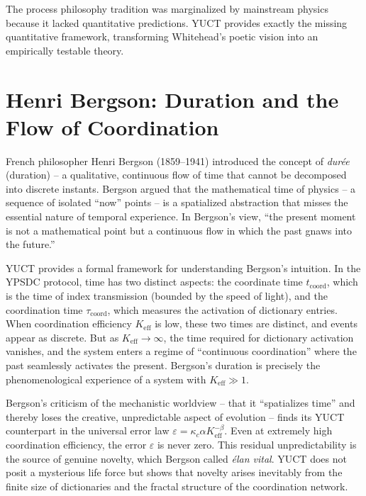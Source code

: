 \documentclass[12pt,a4paper]{article}
\begin{document}
	The process philosophy tradition was marginalized by mainstream physics because it lacked quantitative predictions. YUCT provides exactly the missing quantitative framework, transforming Whitehead's poetic vision into an empirically testable theory.
	
	\section{Henri Bergson: Duration and the Flow of Coordination}
	
	French philosopher Henri Bergson (1859–1941) introduced the concept of \emph{durée} (duration) -- a qualitative, continuous flow of time that cannot be decomposed into discrete instants. Bergson argued that the mathematical time of physics -- a sequence of isolated ``now'' points -- is a spatialized abstraction that misses the essential nature of temporal experience. In Bergson's view, ``the present moment is not a mathematical point but a continuous flow in which the past gnaws into the future.''
	
	YUCT provides a formal framework for understanding Bergson's intuition. In the YPSDC protocol, time has two distinct aspects: the coordinate time \(t_{\text{coord}}\), which is the time of index transmission (bounded by the speed of light), and the coordination time \(\tau_{\text{coord}}\), which measures the activation of dictionary entries. When coordination efficiency \(K_{\mathrm{eff}}\) is low, these two times are distinct, and events appear as discrete. But as \(K_{\mathrm{eff}} \to \infty\), the time required for dictionary activation vanishes, and the system enters a regime of ``continuous coordination'' where the past seamlessly activates the present. Bergson's duration is precisely the phenomenological experience of a system with \(K_{\mathrm{eff}} \gg 1\).
	
	Bergson's criticism of the mechanistic worldview -- that it ``spatializes time'' and thereby loses the creative, unpredictable aspect of evolution -- finds its YUCT counterpart in the universal error law \(\varepsilon = \kappa_c \alpha K_{\mathrm{eff}}^{-\beta}\). Even at extremely high coordination efficiency, the error \(\varepsilon\) is never zero. This residual unpredictability is the source of genuine novelty, which Bergson called \emph{élan vital}. YUCT does not posit a mysterious life force but shows that novelty arises inevitably from the finite size of dictionaries and the fractal structure of the coordination network.
	
\end{document}
